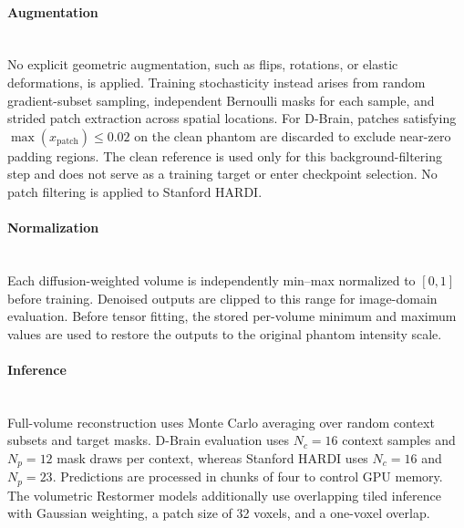 \documentclass[preprint,12pt]{elsarticle}
\begin{document}
\begin{table}[t]
  \centering
  \caption{Progressive training schedule for the primary DRCNet3D and Restormer3D models. Patch sizes are cubic for the 3D models; the 2D architectures use the corresponding in-plane sizes and strides.}
  \label{tab:implementation_schedule}
\end{table}

\paragraph{Augmentation}\mbox{}\\
No explicit geometric augmentation, such as flips, rotations, or elastic deformations, is applied. Training stochasticity instead arises from random gradient-subset sampling, independent Bernoulli masks for each sample, and strided patch extraction across spatial locations. For D-Brain, patches satisfying $\max(x_{\mathrm{patch}}) \leq 0.02$ on the clean phantom are discarded to exclude near-zero padding regions. The clean reference is used only for this background-filtering step and does not serve as a training target or enter checkpoint selection. No patch filtering is applied to Stanford HARDI.

\paragraph{Normalization}\mbox{}\\
Each diffusion-weighted volume is independently min--max normalized to $[0,1]$ before training. Denoised outputs are clipped to this range for image-domain evaluation. Before tensor fitting, the stored per-volume minimum and maximum values are used to restore the outputs to the original phantom intensity scale.

\paragraph{Inference}\mbox{}\\
Full-volume reconstruction uses Monte Carlo averaging over random context subsets and target masks. D-Brain evaluation uses $N_c=16$ context samples and $N_p=12$ mask draws per context, whereas Stanford HARDI uses $N_c=16$ and $N_p=23$. Predictions are processed in chunks of four to control GPU memory. The volumetric Restormer models additionally use overlapping tiled inference with Gaussian weighting, a patch size of 32 voxels, and a one-voxel overlap.
\end{document}
